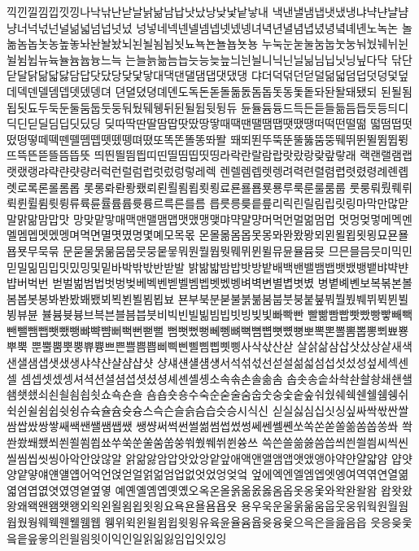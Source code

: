 끽낀낄낌낍낏낑나낙낚난낟날낡낢남납낫났낭낮낯낱낳내
낵낸낼냄냅냇냈냉냐냑냔냘냠냥너넉넋넌널넒넓넘넙넛넜
넝넣네넥넨넬넴넵넷넸넹녀녁년녈념녑녔녕녘녜녠노녹논
놀놂놈놉놋농높놓놔놘놜놨뇌뇐뇔뇜뇝뇟뇨뇩뇬뇰뇹뇻뇽
누눅눈눋눌눔눕눗눙눠눴눼뉘뉜뉠뉨뉩뉴뉵뉼늄늅늉느늑
는늘늙늚늠늡늣능늦늪늬늰늴니닉닌닐닒님닙닛닝닢다닥
닦단닫달닭닮닯닳담답닷닸당닺닻닿대댁댄댈댐댑댓댔댕
댜더덕덖던덛덜덞덟덤덥덧덩덫덮데덱덴델뎀뎁뎃뎄뎅뎌
뎐뎔뎠뎡뎨뎬도독돈돋돌돎돐돔돕돗동돛돝돠돤돨돼됐되
된될됨됩됫됴두둑둔둘둠둡둣둥둬뒀뒈뒝뒤뒨뒬뒵뒷뒹듀
듄듈듐듕드득든듣들듦듬듭듯등듸디딕딘딛딜딤딥딧딨딩
딪따딱딴딸땀땁땃땄땅땋때땍땐땔땜땝땟땠땡떠떡떤떨떪
떫떰떱떳떴떵떻떼떽뗀뗄뗌뗍뗏뗐뗑뗘뗬또똑똔똘똥똬똴
뙈뙤뙨뚜뚝뚠뚤뚫뚬뚱뛔뛰뛴뛸뜀뜁뜅뜨뜩뜬뜯뜰뜸뜹뜻
띄띈띌띔띕띠띤띨띰띱띳띵라락란랄람랍랏랐랑랒랖랗래
랙랜랠램랩랫랬랭랴략랸럇량러럭런럴럼럽럿렀렁렇레렉
렌렐렘렙렛렝려력련렬렴렵렷렸령례롄롑롓로록론롤롬롭
롯롱롸롼뢍뢨뢰뢴뢸룀룁룃룅료룐룔룝룟룡루룩룬룰룸룹
룻룽뤄뤘뤠뤼뤽륀륄륌륏륑류륙륜률륨륩륫륭르륵른를름
릅릇릉릊릍릎리릭린릴림립릿링마막만많맏말맑맒맘맙맛
망맞맡맣매맥맨맬맴맵맷맸맹맺먀먁먈먕머먹먼멀멂멈멉
멋멍멎멓메멕멘멜멤멥멧멨멩며멱면멸몃몄명몇몌모목몫
몬몰몲몸몹못몽뫄뫈뫘뫙뫼묀묄묍묏묑묘묜묠묩묫무묵묶
문묻물묽묾뭄뭅뭇뭉뭍뭏뭐뭔뭘뭡뭣뭬뮈뮌뮐뮤뮨뮬뮴뮷
므믄믈믐믓미믹민믿밀밂밈밉밋밌밍및밑바박밖밗반받발
밝밞밟밤밥밧방밭배백밴밸뱀뱁뱃뱄뱅뱉뱌뱍뱐뱝버벅번
벋벌벎범법벗벙벚베벡벤벧벨벰벱벳벴벵벼벽변별볍볏볐
병볕볘볜보복볶본볼봄봅봇봉봐봔봤봬뵀뵈뵉뵌뵐뵘뵙뵤
뵨부북분붇불붉붊붐붑붓붕붙붚붜붤붰붸뷔뷕뷘뷜뷩뷰뷴
뷸븀븃븅브븍븐블븜븝븟비빅빈빌빎빔빕빗빙빚빛빠빡빤
빨빪빰빱빳빴빵빻빼빽뺀뺄뺌뺍뺏뺐뺑뺘뺙뺨뻐뻑뻔뻗뻘
뻠뻣뻤뻥뻬뼁뼈뼉뼘뼙뼛뼜뼝뽀뽁뽄뽈뽐뽑뽕뾔뾰뿅뿌뿍
뿐뿔뿜뿟뿡쀼쁑쁘쁜쁠쁨쁩삐삑삔삘삠삡삣삥사삭삯산삳
살삵삶삼삽삿샀상샅새색샌샐샘샙샛샜생샤샥샨샬샴샵샷
샹섀섄섈섐섕서석섞섟선섣설섦섧섬섭섯섰성섶세섹센셀
셈셉셋셌셍셔셕션셜셤셥셧셨셩셰셴셸솅소속솎손솔솖솜
솝솟송솥솨솩솬솰솽쇄쇈쇌쇔쇗쇘쇠쇤쇨쇰쇱쇳쇼쇽숀숄
숌숍숏숑수숙순숟술숨숩숫숭숯숱숲숴쉈쉐쉑쉔쉘쉠쉥쉬
쉭쉰쉴쉼쉽쉿슁슈슉슐슘슛슝스슥슨슬슭슴습슷승시식신
싣실싫심십싯싱싶싸싹싻싼쌀쌈쌉쌌쌍쌓쌔쌕쌘쌜쌤쌥쌨
쌩썅써썩썬썰썲썸썹썼썽쎄쎈쎌쏀쏘쏙쏜쏟쏠쏢쏨쏩쏭쏴
쏵쏸쐈쐐쐤쐬쐰쐴쐼쐽쑈쑤쑥쑨쑬쑴쑵쑹쒀쒔쒜쒸쒼쓩쓰
쓱쓴쓸쓺쓿씀씁씌씐씔씜씨씩씬씰씸씹씻씽아악안앉않알
앍앎앓암압앗았앙앝앞애액앤앨앰앱앳앴앵야약얀얄얇얌
얍얏양얕얗얘얜얠얩어억언얹얻얼얽얾엄업없엇었엉엊엌
엎에엑엔엘엠엡엣엥여역엮연열엶엷염엽엾엿였영옅옆옇
예옌옐옘옙옛옜오옥온올옭옮옰옳옴옵옷옹옻와왁완왈왐
왑왓왔왕왜왝왠왬왯왱외왹왼욀욈욉욋욍요욕욘욜욤욥욧
용우욱운울욹욺움웁웃웅워웍원월웜웝웠웡웨웩웬웰웸웹
웽위윅윈윌윔윕윗윙유육윤율윰윱윳융윷으윽은을읊음읍
읏응읒읓읔읕읖읗의읜읠읨읫이익인일읽읾잃임입잇있잉
